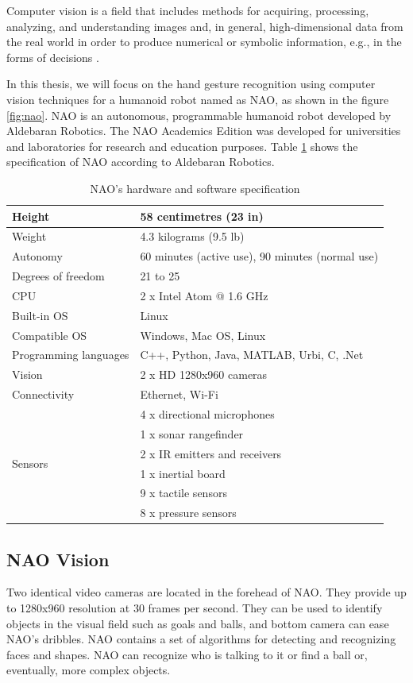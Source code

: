 Computer vision is a field that includes methods for acquiring, processing, analyzing, and understanding images and, in general, high-dimensional data from the real world in order to produce numerical or symbolic information, e.g., in the forms of decisions \cite{1}.

In this thesis, we will focus on the hand gesture recognition using computer vision techniques for a humanoid robot named as NAO, as shown in the figure \ref{fig:nao}. NAO is an autonomous, programmable humanoid robot developed by Aldebaran Robotics. The NAO Academics Edition was developed for universities and laboratories for research and education purposes. Table \ref{tb:nao} shows the specification of NAO according to Aldebaran Robotics.
\begin{table}
	[h] \centering \caption{NAO's hardware and software specification } \label{tb:nao} 
	\begin{tabular}
		{|l|l|} \hline Height & 58 centimetres (23 in) \\
		\hline Weight & 4.3 kilograms (9.5 lb) \\
		\hline Autonomy & 60 minutes (active use), 90 minutes (normal use) \\
		\hline Degrees of freedom & 21 to 25 \\
		\hline CPU & 2 x Intel Atom @ 1.6 GHz \\
		\hline Built-in OS & Linux \\
		\hline Compatible OS & Windows, Mac OS, Linux \\
		\hline Programming languages & C++, Python, Java, MATLAB, Urbi, C, .Net \\
		\hline Vision & 2 x HD 1280x960 cameras \\
		\hline Connectivity & Ethernet, Wi-Fi \\
		\hline \multirow{6}{*}{Sensors} & 4 x directional microphones \\
		& 1 x sonar rangefinder \\
		& 2 x IR emitters and receivers \\
		& 1 x inertial board \\
		& 9 x tactile sensors \\
		& 8 x pressure sensors \\
		\hline 
	\end{tabular}
\end{table}

\subsection{NAO Vision} Two identical video cameras are located in the forehead of NAO. They provide up to 1280x960 resolution at 30 frames per second. They can be used to identify objects in the visual field such as goals and balls, and bottom camera can ease NAO's dribbles. NAO contains a set of algorithms for detecting and recognizing faces and shapes. NAO can recognize who is talking to it or find a ball or, eventually, more complex objects.

